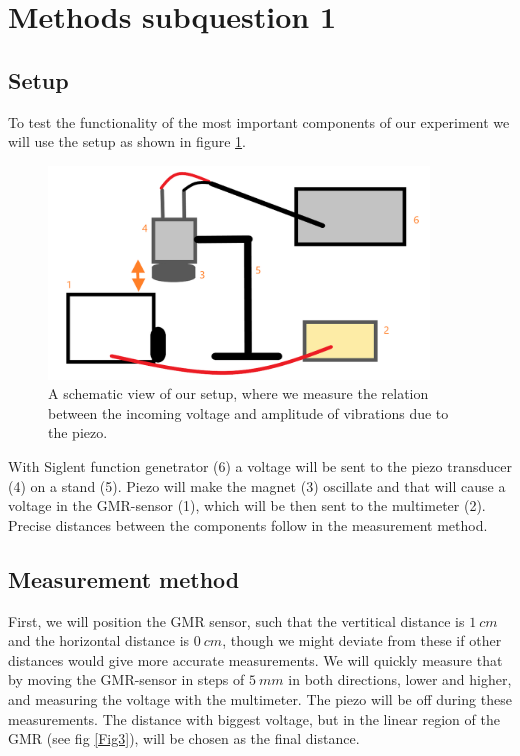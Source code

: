 \documentclass[a4paper,11pt]{article} %
\begin{document}
\section{Methods subquestion 1}

\subsection{Setup}

To test the functionality of the most important components of our experiment we will use the setup as shown in figure \ref{Fig1}.

\begin{figure}[H]\label{Fig1}
  \centering
  \includegraphics[width=0.9\textwidth]{tros.png}
  \caption{A schematic view of our setup, where we measure the relation between the incoming voltage and amplitude of vibrations due to the piezo.} 
\end{figure}

With Siglent function genetrator (6) a voltage will be sent to the piezo transducer (4) on a stand (5). Piezo will make the magnet (3) oscillate and that will cause a voltage in the GMR-sensor (1), which will be then sent to the multimeter (2). Precise distances between the components follow in the measurement method.

\subsection{Measurement method}

First, we will position the GMR sensor, such that the vertitical distance is $\SI{1}{cm}$ and the horizontal distance is $\SI{0}{cm}$, though we might deviate from these if other distances would give more accurate measurements. We will quickly measure that by moving the GMR-sensor in steps of $\SI{5}{mm}$ in both directions, lower and higher, and measuring the voltage with the multimeter. The piezo will be off during these measurements. The distance with biggest voltage, but in the linear region of the GMR (see fig \ref{Fig3}), will be chosen as the final distance.
\end{document}
